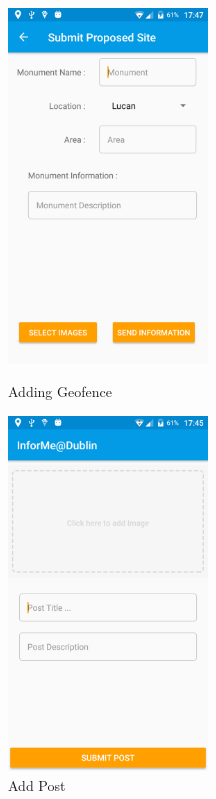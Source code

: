 \begin{figure}[!tbp]
	\centering
	\begin{minipage}[b]{0.4\textwidth}
		\includegraphics[width=150pt]{Adding-Geofence-Request-Email}
		\caption{Adding Geofence }
		\label{Figure: Adding Geofence}
	\end{minipage}
	\hfill
	\begin{minipage}[b]{0.4\textwidth}
		\includegraphics[width=150pt]{Add-Post}
		\caption{Add Post} 
		\label{Figure: Add Post}
	\end{minipage}
\end{figure}

